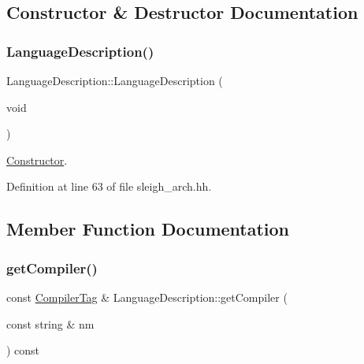 \subsection{Constructor \& Destructor Documentation}
\mbox{\label{class_language_description_aa2b83b431a0270ee0381f9bde5b8fb30}} 
\subsubsection{\texorpdfstring{LanguageDescription()}{LanguageDescription()}}
{\footnotesize\ttfamily Language\+Description\+::\+Language\+Description (\begin{DoxyParamCaption}\item[{void}]{ }\end{DoxyParamCaption})\hspace{0.3cm}{\ttfamily [inline]}}



\mbox{\hyperlink{class_constructor}{Constructor}}. 



Definition at line 63 of file sleigh\+\_\+arch.\+hh.



\subsection{Member Function Documentation}
\mbox{\label{class_language_description_affb841959c4e35e73211e78048a5e156}} 
\subsubsection{\texorpdfstring{getCompiler()}{getCompiler()}}
{\footnotesize\ttfamily const \mbox{\hyperlink{class_compiler_tag}{Compiler\+Tag}} \& Language\+Description\+::get\+Compiler (\begin{DoxyParamCaption}\item[{const string \&}]{nm }\end{DoxyParamCaption}) const}



